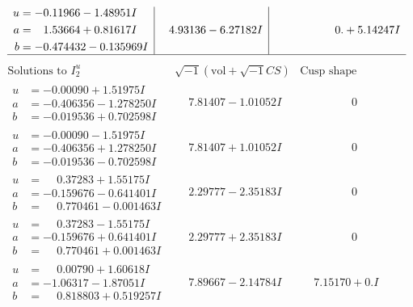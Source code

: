 \documentclass[1p]{elsarticle_modified}
\theoremstyle{definition}
\newcommand{\I}{\sqrt{-1}}
\begin{document}
$$\begin{array}{c|c|c}
\begin{aligned}
u &= -0.11966 - 1.48951 I \\
a &= \phantom{-}1.53664 + 0.81617 I \\
b &= -0.474432 - 0.135969 I\end{aligned}
 & \phantom{-}4.93136 - 6.27182 I & \phantom{-0.000000 -}0. + 5.14247 I\\
 \hline 
 \end{array}$$\newpage$$\begin{array}{c|c|c}  
\text{Solutions to }I^u_{2}& \I (\text{vol} + \sqrt{-1}CS) & \text{Cusp shape}\\
 \hline 
\begin{aligned}
u &= -0.00090 + 1.51975 I \\
a &= -0.406356 - 1.278250 I \\
b &= -0.019536 + 0.702598 I\end{aligned}
 & \phantom{-}7.81407 - 1.01052 I & \phantom{-0.000000 } 0 \\ \hline\begin{aligned}
u &= -0.00090 - 1.51975 I \\
a &= -0.406356 + 1.278250 I \\
b &= -0.019536 - 0.702598 I\end{aligned}
 & \phantom{-}7.81407 + 1.01052 I & \phantom{-0.000000 } 0 \\ \hline\begin{aligned}
u &= \phantom{-}0.37283 + 1.55175 I \\
a &= -0.159676 - 0.641401 I \\
b &= \phantom{-}0.770461 - 0.001463 I\end{aligned}
 & \phantom{-}2.29777 - 2.35183 I & \phantom{-0.000000 } 0 \\ \hline\begin{aligned}
u &= \phantom{-}0.37283 - 1.55175 I \\
a &= -0.159676 + 0.641401 I \\
b &= \phantom{-}0.770461 + 0.001463 I\end{aligned}
 & \phantom{-}2.29777 + 2.35183 I & \phantom{-0.000000 } 0 \\ \hline\begin{aligned}
u &= \phantom{-}0.00790 + 1.60618 I \\
a &= -1.06317 - 1.87051 I \\
b &= \phantom{-}0.818803 + 0.519257 I\end{aligned}
 & \phantom{-}7.89667 - 2.14784 I & \phantom{-}7.15170 + 0. I\phantom{ +0.000000I} \\ \hline\begin{aligned}

\end{aligned}
\end{array}$$
\end{document}
